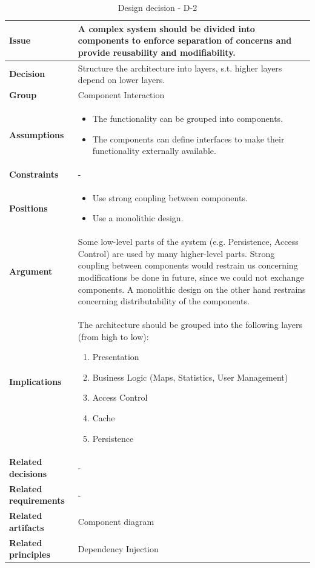 \documentclass[11pt]{article}
\begin{document}
\begin{table}[h] \small
	\begin{tabularx}{\textwidth}{ | l | X |}
    	\hline
	\cellcolor[gray]{0.9}
    	\textbf{Issue} & A complex system should be divided into components to enforce separation of concerns and provide reusability and modifiability. \\
	\hline
	\cellcolor[gray]{0.9}
	\textbf{Decision} & Structure the architecture into layers, s.t. higher layers depend on lower layers. \\
	\hline
	\cellcolor[gray]{0.9}
	\textbf{Group} & Component Interaction \\
	\hline
	\cellcolor[gray]{0.9}
	\textbf{Assumptions} &
		\begin{itemize}
		\item The functionality can be grouped into components.
		\item The components can define interfaces to make their functionality externally available.
		\end{itemize}\\
	\hline
	\cellcolor[gray]{0.9}
	\textbf{Constraints} & - \\
	\hline
	\cellcolor[gray]{0.9}
	\textbf{Positions} &
		\begin{itemize}
		\item Use strong coupling between components.
		\item Use a monolithic design.
		\end{itemize}\\
	\hline
	\cellcolor[gray]{0.9}
	\textbf{Argument} & Some low-level parts of the system (e.g. Persistence, Access Control) are used by many higher-level parts. Strong coupling between components would restrain us concerning modifications be done in future, since we could not exchange components. A monolithic design on the other hand restrains concerning distributability of the components. \\
	\hline
	\cellcolor[gray]{0.9}
	\textbf{Implications} & The architecture should be grouped into the following layers (from high to low):
		\begin{enumerate}
		\item Presentation
		\item Business Logic (Maps, Statistics, User Management)
		\item Access Control
		\item Cache
		\item Persistence
		\end{enumerate}\\
	\hline
	\cellcolor[gray]{0.9}
	\textbf{Related decisions} & - \\
	\hline
	\cellcolor[gray]{0.9}
	\textbf{Related requirements} & -\\
	\hline
	\cellcolor[gray]{0.9}
	\textbf{Related artifacts} & Component diagram\\
	\hline
	\cellcolor[gray]{0.9}
	\textbf{Related principles} & Dependency Injection\\
	\hline
	\end{tabularx}
	\caption{Design decision - D-2}
	\label{dec:D2}
\end{table}
\end{document}
